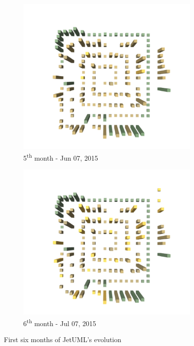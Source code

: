 \begin{figure}[ht]
    \medskip
    \begin{subfigure}{0.48\textwidth}
        \includegraphics[width=\linewidth]{JetUML_V1S5.png}
        \caption{5\textsuperscript{th} month - Jun 07, 2015} \label{fig:JetUML_V1S5}
    \end{subfigure}\hspace*{\fill}
    \begin{subfigure}{0.48\textwidth}
        \includegraphics[width=\linewidth]{JetUML_V1S6.png}
        \caption{6\textsuperscript{th} month - Jul 07, 2015} \label{fig:JetUML_V1S6}
    \end{subfigure}
    
    \caption{First six months of JetUML's evolution} 
    \label{fig:JetUML_V1}
\end{figure}
\clearpage
